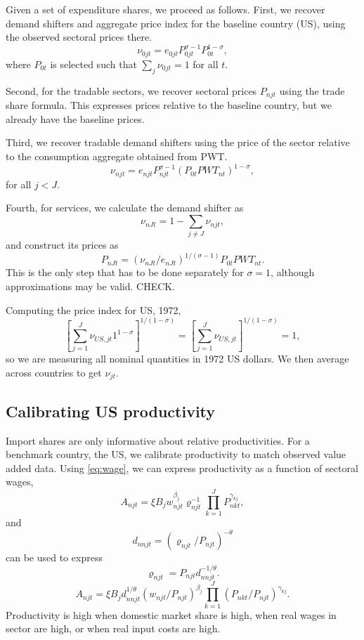 \documentclass[12pt]{article}
\begin{document}
Given a set of expenditure shares, we proceed as follows. First, we recover demand shifters and aggregate price index for the baseline country (US), using the observed sectoral prices there.
\[
\nu_{0jt} = e_{0jt} P_{0jt}^{\sigma-1} P_{0t}^{1-\sigma},
\]
where $P_{0t}$ is selected such that $\sum_j \nu_{0jt}=1$ for all $t$.

Second, for the tradable sectors, we recover sectoral prices $P_{njt}$ using the trade share formula. This expresses prices relative to the baseline country, but we already have the baseline prices.

Third, we recover tradable demand shifters using the price of the sector relative to the consumption aggregate obtained from PWT.
\[
\nu_{njt} = e_{njt} P_{njt}^{\sigma-1} (P_{0t}PWT_{nt})^{1-\sigma},
\]
for all $j<J$.

Fourth, for services, we calculate the demand shifter as 
\[
\nu_{nJt} = 1-\sum_{j\neq J}\nu_{njt},
\]
and construct its prices as
\[
P_{nJt} = (\nu_{nJt}/e_{nJt})^{1/(\sigma-1)} P_{0t}PWT_{nt}.
\]
This is the only step that has to be done separately for $\sigma=1$, although approximations may be valid. CHECK.

Computing the price index for US, 1972,
\begin{equation}
	\left[\sum_{j=1}^J \nu_{US,jt} 1^{1-\sigma}\right]^{1/(1-\sigma)} = 
	\left[\sum_{j=1}^J \nu_{US,jt}\right]^{1/(1-\sigma)}
 =1,
\end{equation}
so we are measuring all nominal quantities in 1972 US dollars. We then average across countries to get $\nu_{jt}$.

\subsection{Calibrating US productivity}
Import shares are only informative about relative productivities. For a benchmark country, the US, we calibrate productivity to match observed value added data. Using \eqref{eq:wage}, we can express productivity as a function of sectoral wages,
\begin{equation*}\label{eq:value_added}
A_{njt} =
	\xi B_j
	w_{njt}^{\beta_j}
	\varrho_{njt}^{-1}  	
	\prod_{k=1}^J P_{nkt}^{\gamma_{kj}},
\end{equation*}
and
\[
d_{nnjt} = (\varrho_{njt}/P_{njt})^{-\theta}
\]
can be used to express
\[
\varrho_{njt} = P_{njt} d_{nnjt}^{-1/\theta}.
\]
\begin{equation}\label{eq:productivity}
A_{njt} =
	\xi B_j
	d_{nnjt}^{1/\theta}
	(w_{njt}/P_{njt})^{\beta_j}
 	\prod_{k=1}^J (P_{nkt}/P_{njt})^{\gamma_{kj}}.
\end{equation}
Productivity is high when domestic market share is high, when real wages in sector are high, or when real input costs are high.
\end{document}
